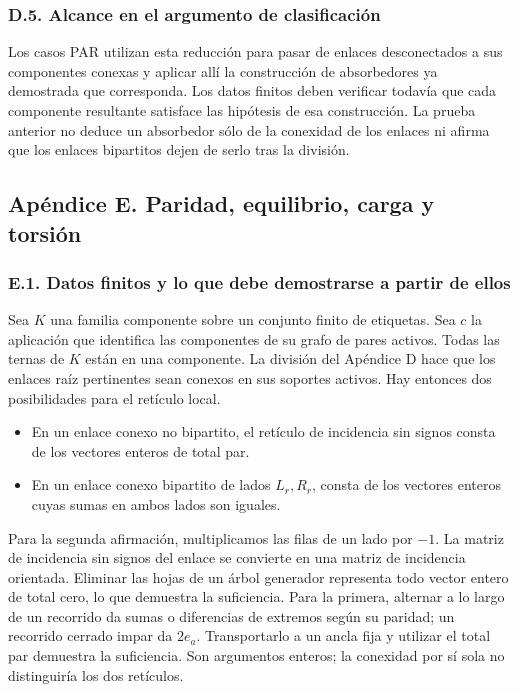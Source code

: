 \documentclass[spanish,11pt,a4paper]{article}
\providecommand{\tightlist}{\setlength{\itemsep}{0pt}\setlength{\parskip}{0pt}}
\begin{document}
\subsubsection{D.5. Alcance en el argumento de clasificación}\label{d.5.-alcance-en-el-argumento-de-clasificaciuxf3n}

Los casos PAR utilizan esta reducción para pasar de enlaces desconectados a sus componentes conexas y aplicar allí la construcción de absorbedores ya demostrada que corresponda. Los datos finitos deben verificar todavía que cada componente resultante satisface las hipótesis de esa construcción. La prueba anterior no deduce un absorbedor sólo de la conexidad de los enlaces ni afirma que los enlaces bipartitos dejen de serlo tras la división.

\bigskip

\subsection{Apéndice E. Paridad, equilibrio, carga y torsión}\label{apuxe9ndice-e.-paridad-equilibrio-carga-y-torsiuxf3n}

\subsubsection{E.1. Datos finitos y lo que debe demostrarse a partir de ellos}\label{e.1.-datos-finitos-y-lo-que-debe-demostrarse-a-partir-de-ellos}

Sea \(K\) una familia componente sobre un conjunto finito de etiquetas. Sea \(c\) la aplicación que identifica las componentes de su grafo de pares activos. Todas las ternas de \(K\) están en una componente. La división del Apéndice D hace que los enlaces raíz pertinentes sean conexos en sus soportes activos. Hay entonces dos posibilidades para el retículo local.

\begin{itemize}
\tightlist
\item
  En un enlace conexo no bipartito, el retículo de incidencia sin signos consta de los vectores enteros de total par.
\item
  En un enlace conexo bipartito de lados \(L_r,R_r\), consta de los vectores enteros cuyas sumas en ambos lados son iguales.
\end{itemize}

Para la segunda afirmación, multiplicamos las filas de un lado por \(-1\). La matriz de incidencia sin signos del enlace se convierte en una matriz de incidencia orientada. Eliminar las hojas de un árbol generador representa todo vector entero de total cero, lo que demuestra la suficiencia. Para la primera, alternar a lo largo de un recorrido da sumas o diferencias de extremos según su paridad; un recorrido cerrado impar da \(2e_a\). Transportarlo a un ancla fija y utilizar el total par demuestra la suficiencia. Son argumentos enteros; la conexidad por sí sola no distinguiría los dos retículos.
\end{document}
